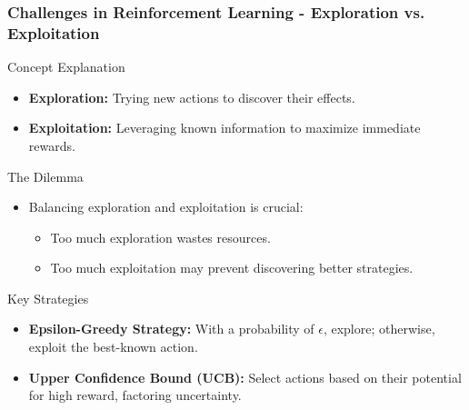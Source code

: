 \documentclass[aspectratio=169]{beamer}
\begin{document}
\begin{frame}[fragile]
    \frametitle{Challenges in Reinforcement Learning - Exploration vs. Exploitation}
    \begin{block}{Concept Explanation}
        \begin{itemize}
            \item \textbf{Exploration:} Trying new actions to discover their effects.
            \item \textbf{Exploitation:} Leveraging known information to maximize immediate rewards.
        \end{itemize}
    \end{block}
    
    \begin{block}{The Dilemma}
        \begin{itemize}
            \item Balancing exploration and exploitation is crucial:
            \begin{itemize}
                \item Too much exploration wastes resources.
                \item Too much exploitation may prevent discovering better strategies.
            \end{itemize}
        \end{itemize}
    \end{block}
    
    \begin{block}{Key Strategies}
        \begin{itemize}
            \item \textbf{Epsilon-Greedy Strategy:} With a probability of $\epsilon$, explore; otherwise, exploit the best-known action.
            \item \textbf{Upper Confidence Bound (UCB):} Select actions based on their potential for high reward, factoring uncertainty.
        \end{itemize}
    \end{block}
\end{frame}
\end{document}
